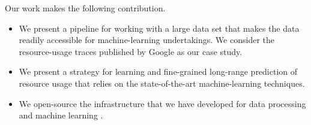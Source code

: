 Our work makes the following contribution.
\begin{itemize}
\item We present a pipeline for working with a large data set that makes the
data readily accessible for machine-learning undertakings. We consider the
resource-usage traces published by Google \cite{reiss2011} as our case study.

\item We present a strategy for learning and fine-grained long-range prediction
of resource usage that relies on the state-of-the-art machine-learning
techniques.

\item We open-source the infrastructure that we have developed for data
processing and machine learning \cite{sources}.
\end{itemize}
